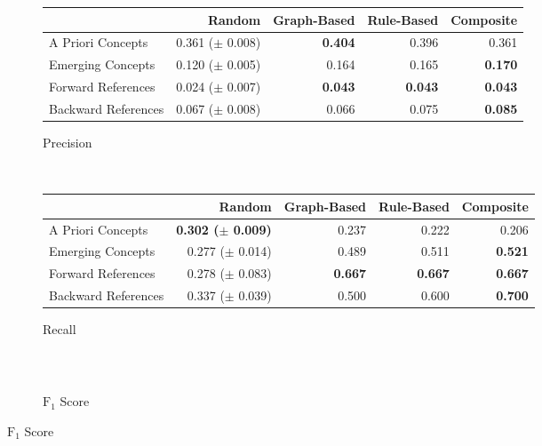 \documentclass[12pt]{article}
\theoremstyle{grammarstyle}
\begin{document}
\begin{figure}
    \centering
    \begin{subfigure}[b]{\textwidth}
        \caption{Precision}
        \label{fig:precision}
        \centering
        \begin{tabular}{|l|r|r|r|r|}
            \hline
            {} & Random & Graph-Based & Rule-Based & Composite \\
            \hline
            A Priori Concepts & 0.361 ($\pm$ 0.008) &        \textbf{0.404} & 0.396 & 0.361 \\
            Emerging Concepts & 0.120 ($\pm$ 0.005) & 0.164 & 0.165 &      \textbf{0.170} \\
            \hline
            Forward References & 0.024 ($\pm$ 0.007) &        \textbf{0.043} &       \textbf{0.043} &     \textbf{ 0.043} \\
            Backward References & 0.067 ($\pm$ 0.008) & 0.066 & 0.075 &      \textbf{0.085} \\
            \hline
        \end{tabular}
    \end{subfigure} \\
    \begin{subfigure}[b]{\textwidth}
        \caption{Recall}
        \label{fig:recall}
        \centering
        \begin{tabular}{|l|r|r|r|r|}
            \hline
            {} & Random & Graph-Based & Rule-Based & Composite \\
            \hline
            A Priori Concepts &  \textbf{0.302 ($\pm$ 0.009)} & 0.237 & 0.222 & 0.206 \\
            Emerging Concepts & 0.277 ($\pm$ 0.014) & 0.489 & 0.511 &      \textbf{0.521} \\
            \hline
            Forward References & 0.278 ($\pm$ 0.083) &        \textbf{0.667} &       \textbf{0.667} &      \textbf{0.667} \\
            Backward References & 0.337 ($\pm$ 0.039) & 0.500 & 0.600 &      \textbf{0.700} \\
            \hline
        \end{tabular}
    \end{subfigure} \\
    \begin{subfigure}[b]{\textwidth}
        \caption{$\text{F}_1$ Score}
        \label{fig:f1_score}
        \centering
        \begin{tabular}{|l|r|r|r|r|}
            \hline

\end{tabular}
\end{subfigure}
\end{figure}
\end{document}
